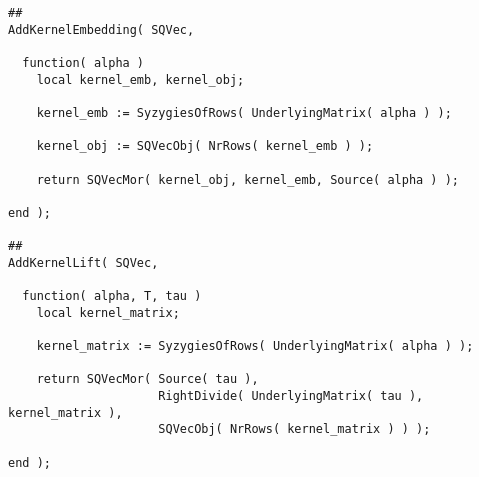 \begin{small}
\begin{Verbatim}[frame=single]
##
AddKernelEmbedding( SQVec,

  function( alpha )
    local kernel_emb, kernel_obj;
    
    kernel_emb := SyzygiesOfRows( UnderlyingMatrix( alpha ) );
    
    kernel_obj := SQVecObj( NrRows( kernel_emb ) );
    
    return SQVecMor( kernel_obj, kernel_emb, Source( alpha ) );
    
end );

##
AddKernelLift( SQVec,

  function( alpha, T, tau )
    local kernel_matrix;
    
    kernel_matrix := SyzygiesOfRows( UnderlyingMatrix( alpha ) );

    return SQVecMor( Source( tau ),
                     RightDivide( UnderlyingMatrix( tau ), kernel_matrix ),
                     SQVecObj( NrRows( kernel_matrix ) ) );
    
end );
\end{Verbatim}
\end{small}
